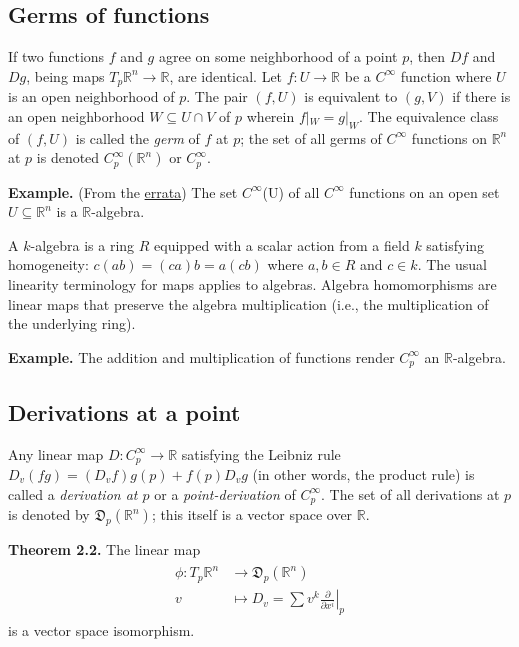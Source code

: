 \documentclass[a4paper]{article}
\newcommand{\R}{\mathbb{R}}
\begin{document}
\subsection{Germs of functions}

If two functions $f$ and $g$ agree on some neighborhood of a point $p$, then $Df$ and $Dg$, being maps $T_p\R^n \to \R$, are identical. Let $f : U \to \R$ be a $C^\infty$ function where $U$ is an open neighborhood of $p$. The pair $(f, U)$ is equivalent to $(g, V)$ if there is an open neighborhood $W \subseteq U \cap V$ of $p$ wherein $f|_W = g|_W$. The equivalence class of $(f, U)$ is called the \emph{germ} of $f$ at $p$; the set of all germs of $C^\infty$ functions on $\R^n$ at $p$ is denoted $C_p^\infty(\R^n)$ or $C_p^\infty$.

\textbf{Example.} (From the \href{https://ltu.pages.tufts.edu/doc/mf2_master_errata2.pdf}{errata}) The set $C^\infty$(U) of all $C^\infty$ functions on an open set $U \subseteq \R^n$ is a $\R$-algebra.

A $k$-algebra is a ring $R$ equipped with a scalar action from a field $k$ satisfying homogeneity: $c(ab) = (ca)b = a(cb)$ where $a, b \in R$ and $c \in k$. The usual linearity terminology for maps applies to algebras. Algebra homomorphisms are linear maps that preserve the algebra multiplication (i.e., the multiplication of the underlying ring).

\textbf{Example.} The addition and multiplication of functions render $C_p^\infty$ an $\R$-algebra.

\subsection{Derivations at a point}

Any linear map $D : C_p^\infty \to \R$ satisfying the Leibniz rule $D_v(fg) = (D_vf)g(p) + f(p)D_vg$ (in other words, the product rule) is called a \emph{derivation at $p$} or a \emph{point-derivation} of $C_p^\infty$. The set of all derivations at $p$ is denoted by $\mathfrak{D}_p(\R^n)$; this itself is a vector space over $\R$.

\textbf{Theorem 2.2.} The linear map
\begin{align}
\begin{split}
    \phi : T_p\R^n &\to \mathfrak{D}_p(\R^n) \\
    v &\mapsto D_v = \sum v^k \left.\frac{\partial}{\partial x^i}\right|_p
\end{split}
\end{align}
is a vector space isomorphism.
\end{document}
